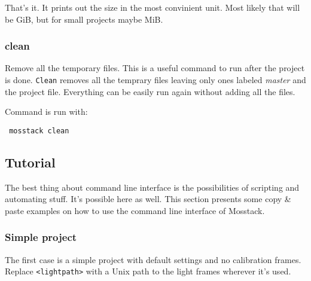 \documentclass[twoside,a4paper]{refart}
\begin{document}
That's it. It prints out the size in the most convinient unit. Most likely that will be GiB, but for small projects
maybe MiB.

\subsubsection{clean}
\label{clean}
Remove all the temporary files. This is a useful command to run after the project is done. \texttt{Clean} removes
all the temprary files leaving only ones labeled \textit{master} and the project file. Everything can be easily
run again without adding all the files.

Command is run with:
\begin{verbatim}
 mosstack clean
\end{verbatim}



\subsection{Tutorial}
\label{tutorial}
The best thing about command line interface is the possibilities of scripting and automating stuff. It's possible
here as well. This section presents some copy \& paste examples on how to use the command line interface of Mosstack.

\subsubsection{Simple project}

The first case is a simple project with default settings and no calibration frames. Replace \texttt{<lightpath>}
with a Unix path to the light frames wherever it's used.
\end{document}
